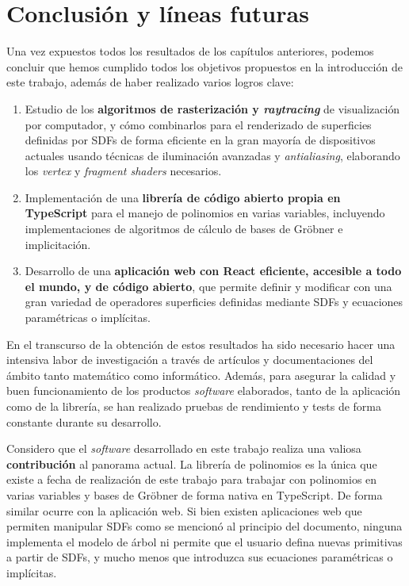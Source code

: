 \chapter{Conclusión y líneas futuras}\label{chapter5}

Una vez expuestos todos los resultados de los capítulos anteriores, podemos concluir que hemos cumplido todos los objetivos propuestos en la introducción de este trabajo, además de haber realizado varios logros clave:
\begin{enumerate}
    \item Estudio de los \textbf{algoritmos de rasterización y \textit{raytracing}} de visualización por computador, y cómo combinarlos para el renderizado de superficies definidas por SDFs de forma eficiente en la gran mayoría de dispositivos actuales usando técnicas de iluminación avanzadas y \textit{antialiasing}, elaborando los \textit{vertex} y \textit{fragment shaders} necesarios.
    \item Implementación de una \textbf{librería de código abierto propia en TypeScript} para el manejo de polinomios en varias variables, incluyendo implementaciones de algoritmos de cálculo de bases de Gröbner e implicitación.
    \item Desarrollo de una \textbf{aplicación web con React eficiente, accesible a todo el mundo, y de código abierto}, que permite definir y modificar con una gran variedad de operadores superficies definidas mediante SDFs y ecuaciones paramétricas o implícitas.
\end{enumerate}
En el transcurso de la obtención de estos resultados ha sido necesario hacer una intensiva labor de investigación a través de artículos y documentaciones del ámbito tanto matemático como informático. Además, para asegurar la calidad y buen funcionamiento de los productos \textit{software} elaborados, tanto de la aplicación como de la librería, se han realizado pruebas de rendimiento y tests de forma constante durante su desarrollo.\newline

Considero que el \textit{software} desarrollado en este trabajo realiza una valiosa \textbf{contribución} al panorama actual. La librería de polinomios es la única que existe a fecha de realización de este trabajo para trabajar con polinomios en varias variables y bases de Gröbner de forma nativa en TypeScript. De forma similar ocurre con la aplicación web. Si bien existen aplicaciones web que permiten manipular SDFs como se mencionó al principio del documento, ninguna implementa el modelo de árbol ni permite que el usuario defina nuevas primitivas a partir de SDFs, y mucho menos que introduzca  sus ecuaciones paramétricas o implícitas.\newline

